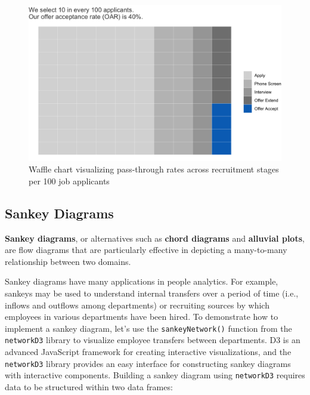 \documentclass[
]{book}
\begin{document}
\begin{figure}

{\centering \includegraphics[width=1\linewidth]{graphics/waffle_chart} 

}

\caption{Waffle chart visualizing pass-through rates across recruitment stages per 100 job applicants}\label{fig:waffle-chart}
\end{figure}

\hypertarget{sankey-diagrams}{%
\subsection{Sankey Diagrams}\label{sankey-diagrams}}

\textbf{Sankey diagrams}, or alternatives such as \textbf{chord diagrams} and \textbf{alluvial plots}, are flow diagrams that are particularly effective in depicting a many-to-many relationship between two domains.

Sankey diagrams have many applications in people analytics. For example, sankeys may be used to understand internal transfers over a period of time (i.e., inflows and outflows among departments) or recruiting sources by which employees in various departments have been hired.
To demonstrate how to implement a sankey diagram, let's use the \texttt{sankeyNetwork()} function from the \texttt{networkD3} library to visualize employee transfers between departments. D3 is an advanced JavaScript framework for creating interactive visualizations, and the \texttt{networkD3} library provides an easy interface for constructing sankey diagrams with interactive components. Building a sankey diagram using \texttt{networkD3} requires data to be structured within two data frames:
\end{document}

